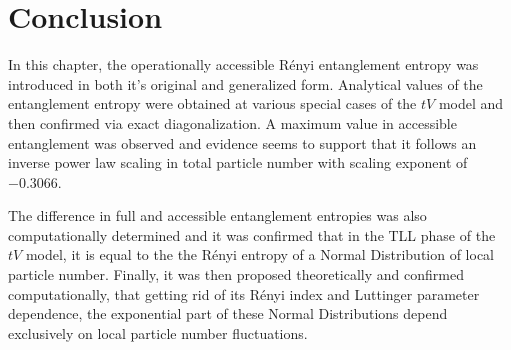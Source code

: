 \section{Conclusion}
In this chapter, the operationally accessible R\'enyi entanglement entropy was introduced in both it's original and generalized form. Analytical values of the entanglement entropy were obtained at various special cases of the $tV$ model and then confirmed via exact diagonalization. A maximum value in accessible entanglement was observed and evidence seems to support that it follows an inverse power law scaling in total particle number with scaling exponent of $-0.3066$. 

The difference in full and accessible entanglement entropies was also computationally determined and it was confirmed that in the TLL phase of the $tV$ model, it is equal to the the R\'enyi entropy of a Normal Distribution of local particle number. Finally, it was then proposed theoretically and confirmed computationally, that getting rid of its R\'enyi index and Luttinger parameter dependence, the exponential part of these Normal Distributions depend exclusively on local particle number fluctuations.

